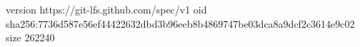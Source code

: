 version https://git-lfs.github.com/spec/v1
oid sha256:7736d587e56ef44422632dbd3b96eeb8b4869747be03dca8a9dcf2c3614e9c02
size 262240
